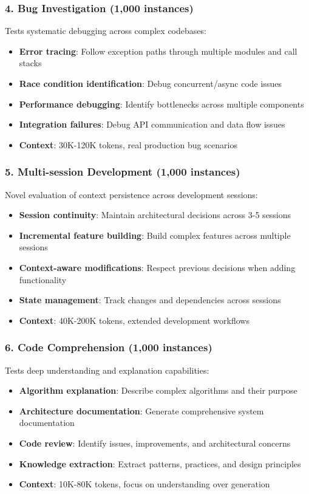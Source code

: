 \documentclass{article}
\begin{document}
\subsubsection{4. Bug Investigation (1,000 instances)}
Tests systematic debugging across complex codebases:
\begin{itemize}
    \item \textbf{Error tracing}: Follow exception paths through multiple modules and call stacks
    \item \textbf{Race condition identification}: Debug concurrent/async code issues
    \item \textbf{Performance debugging}: Identify bottlenecks across multiple components
    \item \textbf{Integration failures}: Debug API communication and data flow issues
    \item \textbf{Context}: 30K-120K tokens, real production bug scenarios
\end{itemize}

\subsubsection{5. Multi-session Development (1,000 instances)}
Novel evaluation of context persistence across development sessions:
\begin{itemize}
    \item \textbf{Session continuity}: Maintain architectural decisions across 3-5 sessions
    \item \textbf{Incremental feature building}: Build complex features across multiple sessions
    \item \textbf{Context-aware modifications}: Respect previous decisions when adding functionality
    \item \textbf{State management}: Track changes and dependencies across sessions
    \item \textbf{Context}: 40K-200K tokens, extended development workflows
\end{itemize}

\subsubsection{6. Code Comprehension (1,000 instances)}
Tests deep understanding and explanation capabilities:
\begin{itemize}
    \item \textbf{Algorithm explanation}: Describe complex algorithms and their purpose
    \item \textbf{Architecture documentation}: Generate comprehensive system documentation
    \item \textbf{Code review}: Identify issues, improvements, and architectural concerns
    \item \textbf{Knowledge extraction}: Extract patterns, practices, and design principles
    \item \textbf{Context}: 10K-80K tokens, focus on understanding over generation
\end{itemize}
\end{document}
